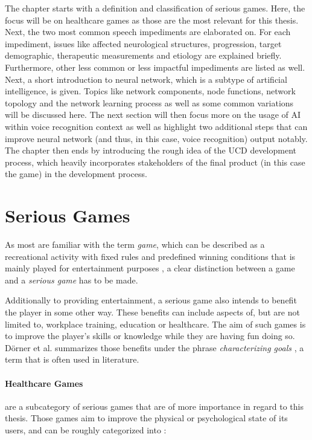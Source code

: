 \documentclass[draft,final]{vutinfth} %
\begin{document}
The chapter starts with a definition and classification of serious games. Here, the focus will be on healthcare games as those are the most relevant for this thesis. Next, the two most common speech impediments are elaborated on. For each impediment, issues like affected neurological structures, progression, target demographic, therapeutic measurements and etiology are explained briefly. Furthermore, other less common or less impactful impediments are listed as well. Next, a short introduction to neural network, which is a subtype of artificial intelligence, is given. Topics like network components, node functions, network topology and the network learning process as well as some common variations will be discussed here. The next section will then focus more on the usage of AI within voice recognition context as well as highlight two additional steps that can improve neural network (and thus, in this case, voice recognition) output notably. The chapter then ends by introducing the rough idea of the UCD development process, which heavily incorporates stakeholders of the final product (in this case the game) in the development process.
\section{Serious Games}
As most are familiar with the term \emph{game}, which can be described as a recreational activity with fixed rules and predefined winning conditions that is mainly played for entertainment purposes \cite{smed2003towards}, a clear distinction between a game and a \emph{serious game} has to be made.

Additionally to providing entertainment, a serious game \cite{susi2007serious} also intends to benefit the player in some other way. These benefits can include aspects of, but are not limited to, workplace training, education or healthcare. The aim of such games is to improve the player's skills or knowledge while they are having fun doing so. Dörner et al. summarizes those benefits under the phrase \emph{characterizing goals} \cite{dorner2016contributing}, a term that is often used in literature.

\paragraph{Healthcare Games} are a subcategory of serious games that are of more importance in regard to this thesis. Those games aim to improve the physical or psychological state of its users, and can be roughly categorized into \cite{susi2007serious}:
\end{document}
